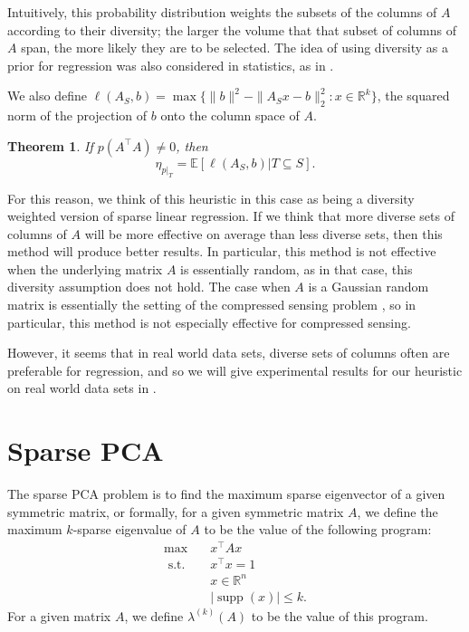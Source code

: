 \documentclass{amsart}
\newtheorem{theorem}{Theorem}[section]
\theoremstyle{definition}
\newcommand{\R}{\mathbb{R}}
\newcommand{\EE}{\mathbb{E}}
\DeclareMathOperator*{\supp}{supp}
\newcommand{\st}{{\text{ s.t. }}}
\begin{document}
Intuitively, this probability distribution weights the subsets of the columns of $A$ according to their diversity; the larger the volume that that subset of columns of $A$ span, the more likely they are to be selected.
The idea of using diversity as a prior for regression was also considered in statistics, as in \cite{kojima2016determinantal}.

We also define $\ell(A_S, b) = \max \{\|b\|^2 - \|A_Sx - b\|_2^2 : x \in \R^k\}$, the squared norm of the projection of $b$ onto the column space of $A$.
\begin{theorem}
    \label{thm:probabilistic_eq}
    If $p(A^{\intercal}A) \neq 0$, then
    \[
        \eta_{p|_T} = \EE[\ell(A_S, b) | T \subseteq S].
    \]
\end{theorem}
For this reason, we think of this heuristic in this case as being a diversity weighted version of sparse linear regression.
If we think that more diverse sets of columns of $A$ will be more effective on average than less diverse sets, then this method will produce better results.
In particular, this method is not effective when the underlying matrix $A$ is essentially random, as in that case, this diversity assumption does not hold.
The case when $A$ is a Gaussian random matrix is essentially the setting of the compressed sensing problem \cite{candes2005decoding}, so in particular, this method is not especially effective for compressed sensing.

However, it seems that in real world data sets, diverse sets of columns often are preferable for regression, and so we will give experimental results for our heuristic on real world data sets in .

\section{Sparse PCA}
\label{sec:sparsePCA}
The sparse PCA problem is to find the maximum sparse eigenvector of a given symmetric matrix, or formally, for a given symmetric matrix $A$, we define the maximum $k$-sparse eigenvalue of $A$ to be the value of the following program:
\begin{equation*}
\begin{aligned}
    \max\quad & x^{\intercal}Ax\\
    \st & x^{\intercal}x = 1\\
        & x \in \R^n\\
        &|\supp(x)| \le k.
\end{aligned}
\label{eq:sparse_pca}
\end{equation*}
For a given matrix $A$, we define $\lambda^{(k)}(A)$ to be the value of this program.
\end{document}
